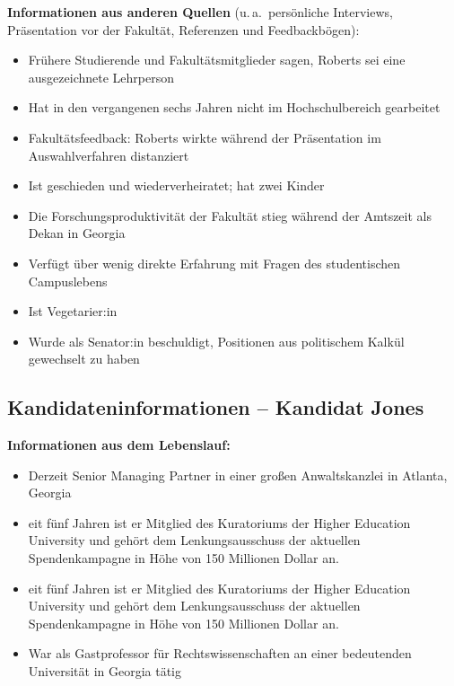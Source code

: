\textbf{Informationen aus anderen Quellen}
(u.\,a.\ persönliche Interviews, Präsentation vor der Fakultät, Referenzen und Feedbackbögen):
\begin{itemize}
  \item Frühere Studierende und Fakultätsmitglieder sagen, Roberts sei eine ausgezeichnete Lehrperson
  \item Hat in den vergangenen sechs Jahren nicht im Hochschulbereich gearbeitet
  \item Fakultätsfeedback: Roberts wirkte während der Präsentation im Auswahlverfahren distanziert
  \item Ist geschieden und wiederverheiratet; hat zwei Kinder
  \item Die Forschungsproduktivität der Fakultät stieg während der Amtszeit als Dekan in Georgia
  \item Verfügt über wenig direkte Erfahrung mit Fragen des studentischen Campuslebens
  \item Ist Vegetarier:in
  \item Wurde als Senator:in beschuldigt, Positionen aus politischem Kalkül gewechselt zu haben
\end{itemize}

\clearpage
\subsection*{Kandidateninformationen -- Kandidat Jones}
\thispagestyle{empty}

\textbf{Informationen aus dem Lebenslauf:}
\begin{itemize}
  \item Derzeit Senior Managing Partner in einer großen Anwaltskanzlei in Atlanta, Georgia
  \item eit fünf Jahren ist er Mitglied des Kuratoriums der Higher Education University
    und gehört dem Lenkungsausschuss der aktuellen Spendenkampagne in Höhe von
    150 Millionen Dollar an.
  \item eit fünf Jahren ist er Mitglied des Kuratoriums der Higher Education University
    und gehört dem Lenkungsausschuss der aktuellen Spendenkampagne in Höhe von
    150 Millionen Dollar an.
  \item War als Gastprofessor für Rechtswissenschaften an einer bedeutenden Universität in
    Georgia tätig
\end{itemize}

